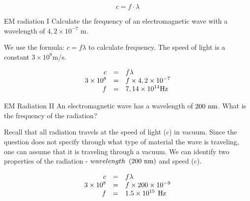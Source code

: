     \begin{equation}
    c=f\ensuremath{\cdot}\lambda
      \end{equation}
      \par
            \label{m38777*eip-923}\vspace{.5cm} 
      \noindent
      \begin{wex}{EM radiation I}{
      \label{m38777*id187899}Calculate the frequency of an electromagnetic wave with a wavelength of $4,2\ensuremath{\times}{10}^{-7}$ m.}
      { 
      \label{m38777*id187948}We use the formula: $c=f\lambda $ to calculate frequency. The speed of light is a constant $3\ensuremath{\times}{10}^{8}$m/s.\par 
    \begin{equation}
    \begin{array}{ccc}\hfill c& =& f\lambda \hfill \\ \hfill 3\ensuremath{\times}{10}^{8}& =& f\ensuremath{\times}4,2\ensuremath{\times}{10}^{-7}\hfill \\ \hfill f& =& 7,14\ensuremath{\times}{10}^{14}\text{Hz}\hfill \end{array}
      \end{equation}}    \end{wex}
 
      \begin{wex}{EM Radiation II}{
      \label{m38777*id188123}An electromagnetic wave has a wavelength of $200\phantom{\rule{3.33333pt}{0ex}}\text{nm}$. What is the frequency of the radiation?}{
      \label{m38777*id188341}Recall that all radiation travels at the speed of light ($c$) in vacuum.
Since the question does not specify through what type of material the wave
is traveling, one can assume that it is traveling through a vacuum.
We can identify two properties of the radiation - $wavelength\phantom{\rule{3.33333pt}{0ex}}\left(200\phantom{\rule{3.33333pt}{0ex}}\text{nm}\right)$ and speed ($c$).\par 
    \begin{equation}
    \begin{array}{ccc}\hfill c& =& f\lambda \hfill \\ \hfill 3\ensuremath{\times}{10}^{8}& =& f\ensuremath{\times}200\ensuremath{\times}{10}^{-9}\hfill \\ \hfill f& =& 1.5\ensuremath{\times}{10}^{15}\phantom{\rule{4pt}{0ex}}\text{Hz}\hfill \end{array}
      \end{equation}}    \end{wex}
